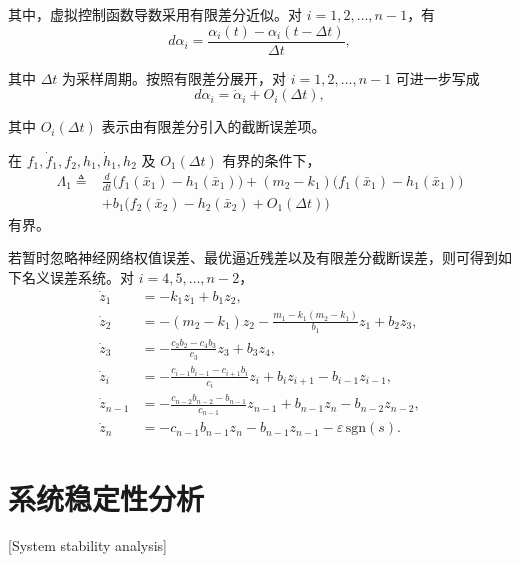 其中，虚拟控制函数导数采用有限差分近似。对 $i=1,2,\ldots,n-1$，有
\begin{equation}\label{eq:ch2_finite_difference}
  d\alpha_i=\frac{\alpha_i(t)-\alpha_i(t-\Delta t)}{\Delta t},
\end{equation}

其中 $\Delta t$ 为采样周期。按照有限差分展开，对 $i=1,2,\ldots,n-1$ 可进一步写成
\begin{equation}\label{eq:ch2_dalpha_expand}
  d\alpha_i=\dot\alpha_i+O_i(\Delta t),
\end{equation}

其中 $O_i(\Delta t)$ 表示由有限差分引入的截断误差项。

\begin{assumption}\label{assump:lambda1}
  在 $f_1,\dot f_1,f_2,h_1,\dot h_1,h_2$ 及 $O_1(\Delta t)$ 有界的条件下，
  \begin{equation}
  \begin{aligned}
  \Lambda_1\triangleq{}& \frac{d}{dt}\big(f_1(\bar x_1)-h_1(\bar x_1)\big)
  +(m_2-k_1)\big(f_1(\bar x_1)-h_1(\bar x_1)\big)\\
  &+b_1\big(f_2(\bar x_2)-h_2(\bar x_2)+O_1(\Delta t)\big)
  \end{aligned}
  \end{equation}
  有界。
\end{assumption}

若暂时忽略神经网络权值误差、最优逼近残差以及有限差分截断误差，则可得到如下名义误差系统。对 $i=4,5,\ldots,n-2$，
\begin{subequations}\label{eq:ch3_zdot_stab}
\begin{align}
\dot z_1&=-k_1z_1+b_1z_2,\label{eq:ch3_zdot_stab_a}\\
\dot z_2&=-(m_2-k_1)z_2-\frac{m_1-k_1(m_2-k_1)}{b_1}z_1+b_2z_3,\label{eq:ch3_zdot_stab_b}\\
\dot z_3&=-\frac{c_2b_2-c_4b_3}{c_3}z_3+b_3z_4,\label{eq:ch3_zdot_stab_c}\\
\dot z_i&=-\frac{c_{i-1}b_{i-1}-c_{i+1}b_i}{c_i}z_i+b_iz_{i+1}-b_{i-1}z_{i-1},\label{eq:ch3_zdot_stab_d}\\
\dot z_{n-1}&=-\frac{c_{n-2}b_{n-2}-b_{n-1}}{c_{n-1}}z_{n-1}+b_{n-1}z_n-b_{n-2}z_{n-2},\label{eq:ch3_zdot_stab_e}\\
\dot z_n&=-c_{n-1}b_{n-1}z_n-b_{n-1}z_{n-1}-\varepsilon\,\mathrm{sgn}(s).\label{eq:ch3_zdot_stab_f}
\end{align}
\end{subequations}

\section{系统稳定性分析}[System stability analysis]\label{sec:ch3_stab2}

